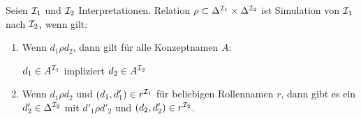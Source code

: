 \begin{definition}[Simulation]
    Seien $\mathcal{I}_1$ und $\mathcal{I}_2$ Interpretationen. Relation $\rho \subset \Delta^{\mathcal{I}_1} \times \Delta^{\mathcal{I}_2}$ ist Simulation von $\mathcal{I}_1$ nach $\mathcal{I}_2$, wenn gilt:
    \begin{enumerate}
        \item Wenn $d_1 \rho d_2$, dann gilt für alle Konzeptnamen $A$:
            \begin{center}
                $d_1 \in A^{\mathcal{I}_1}$ impliziert $d_2 \in A^{\mathcal{I}_2}$
            \end{center}
        \item Wenn $d_1 \rho d_2$ und $(d_1, d'_1) \in r^{\mathcal{I}_1}$ für beliebigen Rollennamen $r$, dann gibt es ein $d'_2 \in \Delta^{\mathcal{I}_2}$ mit $d'_1 \rho d'_2$ und $(d_2, d'_2) \in r^{\mathcal{I}_2}$.
    \end{enumerate}
\end{definition}

